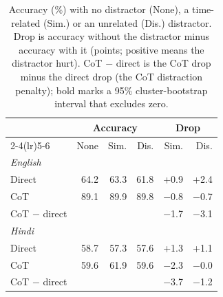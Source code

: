 \begin{table}[t]
\centering
\small
\setlength{\tabcolsep}{4pt}
\begin{tabular}{lrrrrr}
\toprule
 & \multicolumn{3}{c}{Accuracy} & \multicolumn{2}{c}{Drop} \\
\cmidrule(lr){2-4}\cmidrule(lr){5-6}
 & None & Sim. & Dis. & Sim. & Dis. \\
\midrule
\multicolumn{6}{l}{\textit{English}} \\
\quad Direct & 64.2 & 63.3 & 61.8 & +0.9 & +2.4 \\
\quad CoT & 89.1 & 89.9 & 89.8 & $-$0.8 & $-$0.7 \\
\quad CoT $-$ direct &  &  &  & $-$1.7 & $-$3.1 \\
\midrule
\multicolumn{6}{l}{\textit{Hindi}} \\
\quad Direct & 58.7 & 57.3 & 57.6 & +1.3 & +1.1 \\
\quad CoT & 59.6 & 61.9 & 59.6 & $-$2.3 & $-$0.0 \\
\quad CoT $-$ direct &  &  &  & $-$3.7 & $-$1.2 \\
\bottomrule
\end{tabular}
\caption{Accuracy (\%) with no distractor (None), a time-related (Sim.) or an unrelated (Dis.) distractor. Drop is accuracy without the distractor minus accuracy with it (points; positive means the distractor hurt). CoT $-$ direct is the CoT drop minus the direct drop (the CoT distraction penalty); bold marks a 95\% cluster-bootstrap interval that excludes zero.}
\label{tab:distractor}
\end{table}
